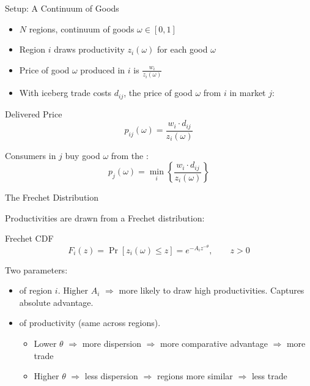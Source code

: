 \documentclass{beamer}
\begin{document}
\begin{frame}{Setup: A Continuum of Goods}

    \begin{itemize}
        \item $N$ regions, continuum of goods $\omega \in [0,1]$
        \item Region $i$ draws productivity $z_i(\omega)$ for each good $\omega$
        \item {} Price of good $\omega$ produced in $i$ is $\frac{w_i}{z_i(\omega)}$
        \item With iceberg trade costs $d_{ij}$, the price of good $\omega$ from $i$ in market $j$:
    \end{itemize}

    \vspace{0.3em}
    \begin{block}{Delivered Price}
        \vspace{-0.5em}
        \[ p_{ij}(\omega) = \frac{w_i \cdot d_{ij}}{z_i(\omega)} \]
    \end{block}

    \vspace{0.3em}
    Consumers in $j$ buy good $\omega$ from the :
    \[ p_j(\omega) = \min_{i} \left\{ \frac{w_i \cdot d_{ij}}{z_i(\omega)} \right\} \]

\end{frame}

\begin{frame}{The Frechet Distribution}

     Productivities are drawn from a Frechet distribution:

    \begin{block}{Frechet CDF}
        \vspace{-0.5em}
        \[ F_i(z) = \Pr[z_i(\omega) \leq z] = e^{-A_i z^{-\theta}}, \qquad z > 0 \]
    \end{block}

    \vspace{0.2em}
    Two parameters:
    \begin{itemize}
        \item {}  of region $i$. Higher $A_i$ $\Rightarrow$ more likely to draw high productivities. Captures absolute advantage.
        \item {}  of productivity (same across regions).
            \begin{itemize}
                \item Lower $\theta$ $\Rightarrow$ more dispersion $\Rightarrow$ more comparative advantage $\Rightarrow$ more trade
                \item Higher $\theta$ $\Rightarrow$ less dispersion $\Rightarrow$ regions more similar $\Rightarrow$ less trade
            \end{itemize}
    \end{itemize}

\end{frame}
\end{document}

